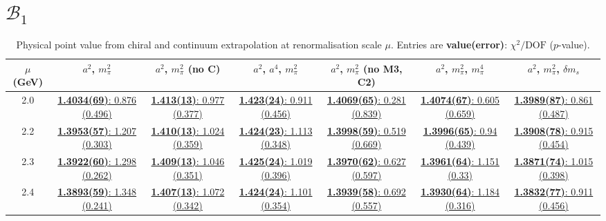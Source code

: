 \documentclass[12pt]{extarticle}
\begin{document}
\section{$\mathcal{B}_1$}
\begin{table}[h!]
\begin{center}
\begin{tabular}{|c|c|c|c|c|c|c|}
\hline
$\mu$ (GeV) & $a^2$, $m_\pi^2$& $a^2$, $m_\pi^2$ (no C)& $a^2$, $a^4$, $m_\pi^2$& $a^2$, $m_\pi^2$ (no M3, C2)& $a^2$, $m_\pi^2$, $m_\pi^4$& $a^2$, $m_\pi^2$, $\delta m_s$\\
\hline
2.0& \hyperlink{VVpAA/NPR/a2m2_20.pdf.1}{\textbf{1.4034(69)}: 0.876 (0.496)} & \hyperlink{VVpAA/NPR/a2m2noC_20.pdf.1}{\textbf{1.413(13)}: 0.977 (0.377)} & \hyperlink{VVpAA/NPR/a2a4m2_20.pdf.1}{\textbf{1.423(24)}: 0.911 (0.456)} & \hyperlink{VVpAA/NPR/a2m2mcut_20.pdf.1}{\textbf{1.4069(65)}: 0.281 (0.839)} & \hyperlink{VVpAA/NPR/a2m2m4_20.pdf.1}{\textbf{1.4074(67)}: 0.605 (0.659)} & \hyperlink{VVpAA/NPR/a2m2delm_20.pdf.1}{\textbf{1.3989(87)}: 0.861 (0.487)}\\
2.2& \hyperlink{VVpAA/NPR/a2m2_22.pdf.1}{\textbf{1.3953(57)}: 1.207 (0.303)} & \hyperlink{VVpAA/NPR/a2m2noC_22.pdf.1}{\textbf{1.410(13)}: 1.024 (0.359)} & \hyperlink{VVpAA/NPR/a2a4m2_22.pdf.1}{\textbf{1.424(23)}: 1.113 (0.348)} & \hyperlink{VVpAA/NPR/a2m2mcut_22.pdf.1}{\textbf{1.3998(59)}: 0.519 (0.669)} & \hyperlink{VVpAA/NPR/a2m2m4_22.pdf.1}{\textbf{1.3996(65)}: 0.94 (0.439)} & \hyperlink{VVpAA/NPR/a2m2delm_22.pdf.1}{\textbf{1.3908(78)}: 0.915 (0.454)}\\
2.3& \hyperlink{VVpAA/NPR/a2m2_23.pdf.1}{\textbf{1.3922(60)}: 1.298 (0.262)} & \hyperlink{VVpAA/NPR/a2m2noC_23.pdf.1}{\textbf{1.409(13)}: 1.046 (0.351)} & \hyperlink{VVpAA/NPR/a2a4m2_23.pdf.1}{\textbf{1.425(24)}: 1.019 (0.396)} & \hyperlink{VVpAA/NPR/a2m2mcut_23.pdf.1}{\textbf{1.3970(62)}: 0.627 (0.597)} & \hyperlink{VVpAA/NPR/a2m2m4_23.pdf.1}{\textbf{1.3961(64)}: 1.151 (0.33)} & \hyperlink{VVpAA/NPR/a2m2delm_23.pdf.1}{\textbf{1.3871(74)}: 1.015 (0.398)}\\
2.4& \hyperlink{VVpAA/NPR/a2m2_24.pdf.1}{\textbf{1.3893(59)}: 1.348 (0.241)} & \hyperlink{VVpAA/NPR/a2m2noC_24.pdf.1}{\textbf{1.407(13)}: 1.072 (0.342)} & \hyperlink{VVpAA/NPR/a2a4m2_24.pdf.1}{\textbf{1.424(24)}: 1.101 (0.354)} & \hyperlink{VVpAA/NPR/a2m2mcut_24.pdf.1}{\textbf{1.3939(58)}: 0.692 (0.557)} & \hyperlink{VVpAA/NPR/a2m2m4_24.pdf.1}{\textbf{1.3930(64)}: 1.184 (0.316)} & \hyperlink{VVpAA/NPR/a2m2delm_24.pdf.1}{\textbf{1.3832(77)}: 0.911 (0.456)}\\
\hline
\end{tabular}
\caption{Physical point value from chiral and continuum extrapolation at renormalisation scale $\mu$. Entries are \textbf{value(error)}: $\chi^2/\text{DOF}$ ($p$-value).}
\end{center}
\end{table}
\end{document}
